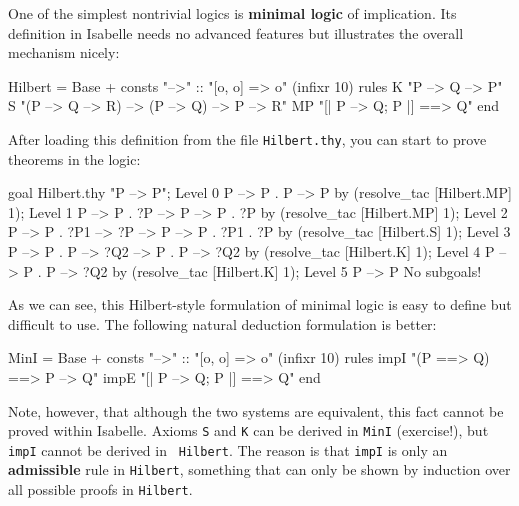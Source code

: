 One of the simplest nontrivial logics is {\bf minimal logic} of
implication.  Its definition in Isabelle needs no advanced features but
illustrates the overall mechanism nicely:
\begin{ttbox}
Hilbert = Base +
consts
  "-->" :: "[o, o] => o"   (infixr 10)
rules
  K     "P --> Q --> P"
  S     "(P --> Q --> R) --> (P --> Q) --> P --> R"
  MP    "[| P --> Q; P |] ==> Q"
end
\end{ttbox}
After loading this definition from the file {\tt Hilbert.thy}, you can
start to prove theorems in the logic:
\begin{ttbox}
goal Hilbert.thy "P --> P";
{\out Level 0}
{\out P --> P}
{.  P --> P}
\ttbreak
by (resolve_tac [Hilbert.MP] 1);
{\out Level 1}
{\out P --> P}
{.  ?P --> P --> P}
{.  ?P}
\ttbreak
by (resolve_tac [Hilbert.MP] 1);
{\out Level 2}
{\out P --> P}
{.  ?P1 --> ?P --> P --> P}
{.  ?P1}
{.  ?P}
\ttbreak
by (resolve_tac [Hilbert.S] 1);
{\out Level 3}
{\out P --> P}
{.  P --> ?Q2 --> P}
{.  P --> ?Q2}
\ttbreak
by (resolve_tac [Hilbert.K] 1);
{\out Level 4}
{\out P --> P}
{.  P --> ?Q2}
\ttbreak
by (resolve_tac [Hilbert.K] 1);
{\out Level 5}
{\out P --> P}
{\out No subgoals!}
\end{ttbox}
As we can see, this Hilbert-style formulation of minimal logic is easy to
define but difficult to use.  The following natural deduction formulation is
better:
\begin{ttbox}
MinI = Base +
consts
  "-->" :: "[o, o] => o"   (infixr 10)
rules
  impI  "(P ==> Q) ==> P --> Q"
  impE  "[| P --> Q; P |] ==> Q"
end
\end{ttbox}
Note, however, that although the two systems are equivalent, this fact
cannot be proved within Isabelle.  Axioms {\tt S} and {\tt K} can be
derived in {\tt MinI} (exercise!), but {\tt impI} cannot be derived in {\tt
  Hilbert}.  The reason is that {\tt impI} is only an {\bf admissible} rule
in {\tt Hilbert}, something that can only be shown by induction over all
possible proofs in {\tt Hilbert}.

